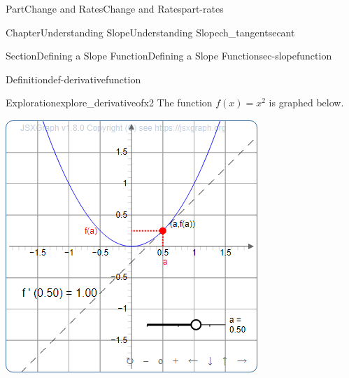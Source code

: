 \documentclass{tufte-book}
\numberwithin{equation}{chapter}
\begin{document}
\begin{partptx}{Part}{Change and Rates}{}{Change and Rates}{}{}{part-rates}
\begin{chapterptx}{Chapter}{Understanding Slope}{}{Understanding Slope}{}{}{ch_tangentsecant}
\begin{sectionptx}{Section}{Defining a Slope Function}{}{Defining a Slope Function}{}{}{sec-slopefunction}
\begin{definition}{Definition}{}{def-derivativefunction}
\end{definition}
\begin{exploration}{Exploration}{}{explore_derivativeofx2}%
The function \(f(x) = x^2\) is graphed below. \begin{sidebyside}{2}{0.075}{0.075}{0.17}%
\begin{sbspanel}{0.47}%
\includegraphics[width=\linewidth]{generated/preview/explore_derivativeofx2-1-1-2-preview.png}
\end{sbspanel}%
\begin{sbspanel}{0.21}%

\end{sbspanel}
\end{sidebyside}
\end{exploration}
\end{sectionptx}
\end{chapterptx}
\end{partptx}
\end{document}
